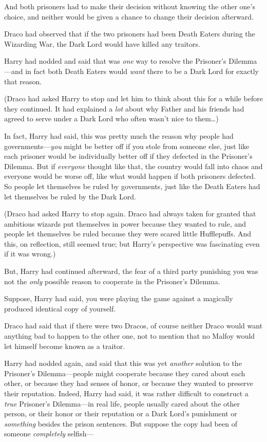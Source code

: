 And both prisoners had to make their decision without knowing the other one's
choice, and neither would be given a chance to change their decision afterward.

Draco had observed that if the two prisoners had been Death Eaters during the
Wizarding War, the Dark Lord would have killed any traitors.

Harry had nodded and said that was \emph{one} way to resolve the Prisoner's
Dilemma---and in fact both Death Eaters would \emph{want} there to be a Dark
Lord for exactly that reason.

(Draco had asked Harry to stop and let him to think about this for a while
before they continued. It had explained a \emph{lot} about why Father and his
friends had agreed to serve under a Dark Lord who often wasn't nice to
them{\ldots})

In fact, Harry had said, this was pretty much the reason why people had
governments---\emph{you} might be better off if you stole from someone else,
just like each prisoner would be individually better off if they defected in
the Prisoner's Dilemma. But if \emph{everyone} thought like that, the country
would fall into chaos and everyone would be worse off, like what would happen
if both prisoners defected. So people let themselves be ruled by governments,
just like the Death Eaters had let themselves be ruled by the Dark Lord.

(Draco had asked Harry to stop again. Draco had always taken for granted that
ambitious wizards put themselves in power because they wanted to rule, and
people let themselves be ruled because they were scared little Hufflepuffs. And
this, on reflection, still seemed true; but Harry's perspective was fascinating
even if it was wrong.)

But, Harry had continued afterward, the fear of a third party punishing you was
not the \emph{only} possible reason to cooperate in the Prisoner's Dilemma.

Suppose, Harry had said, you were playing the game against a magically produced
identical copy of yourself.

Draco had said that if there were two Dracos, of course neither Draco would
want anything bad to happen to the other one, not to mention that no Malfoy
would let himself become known as a traitor.

Harry had nodded again, and said that this was yet \emph{another} solution to
the Prisoner's Dilemma---people might cooperate because they cared about each
other, or because they had senses of honor, or because they wanted to preserve
their reputation. Indeed, Harry had said, it was rather difficult to construct
a \emph{true} Prisoner's Dilemma---in real life, people usually cared about the
other person, or their honor or their reputation or a Dark Lord's punishment or
\emph{something} besides the prison sentences. But suppose the copy had been of
someone \emph{completely} selfish---

